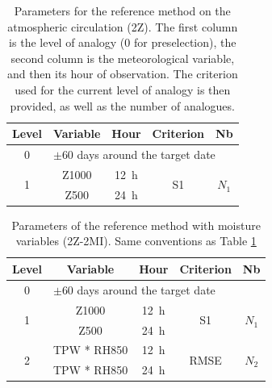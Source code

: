 \documentclass[hess, manuscript]{copernicus}
\begin{document}
	
	\clearpage
	
	
	\begin{table}[htb]
		\caption{Parameters for the reference method on the atmospheric circulation (2Z). The first column is the level of analogy (0 for preselection), the second column is the meteorological variable, and then its hour of observation. The criterion used for the current level of analogy is then provided, as well as the number of analogues.}
		\footnotesize
		\begin{center}
			\begin{tabular}{ccccc}
				\hline
				Level & Variable & Hour & Criterion & Nb \\ 
				\hline 
				0 & \multicolumn{4}{l}{$\pm 60$ days around the target date} \\
				\hline 
				\multirow{2}{*}{1} & Z1000 & 12~h & \multirow{2}{*}{S1} & \multirow{2}{*}{$N_{1}$} \\
				& Z500 & 24~h & & \\ 
				\hline 
			\end{tabular} 
		\end{center}
		\label{table:method_2Z}
	\end{table}
	
	\begin{table}[htb]
		\caption{Parameters of the reference method with moisture variables (2Z-2MI). Same conventions as Table \ref{table:method_2Z}}
		\footnotesize
		\begin{center}
			\begin{tabular}{ccccc}
				\hline 
				Level & Variable & Hour & Criterion & Nb \\ 
				\hline 
				0 & \multicolumn{4}{l}{$\pm 60$ days around the target date} \\
				\hline 
				\multirow{2}{*}{1} & Z1000 & 12~h & \multirow{2}{*}{S1} & \multirow{2}{*}{$N_{1}$} \\
				& Z500 & 24~h & & \\ 
				\hline
				\multirow{2}{*}{2} & TPW * RH850 & 12~h & \multirow{2}{*}{RMSE} & \multirow{2}{*}{$N_{2}$} \\
				& TPW * RH850 & 24~h & & \\ 
				\hline 
			\end{tabular} 
		\end{center}
		\label{table:method_2Z-2MI}
	\end{table}
	
	
	
	
\end{document}
